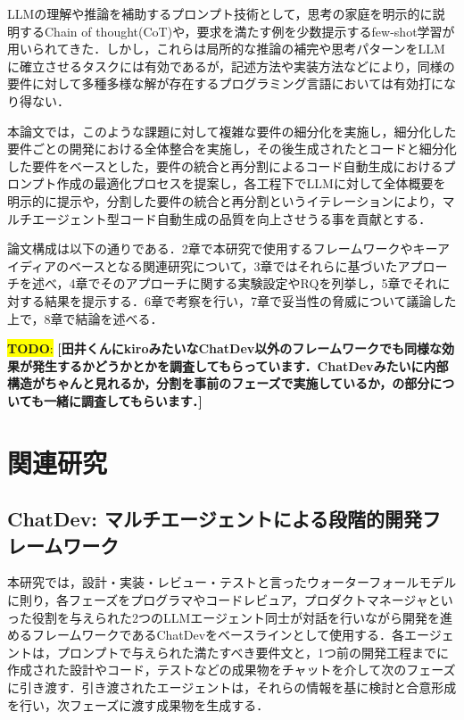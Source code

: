 \documentclass[submit,techrep,noauthor]{ipsj}
\newcommand{\todo}[1]{\colorbox{yellow}{{\bf TODO}:}{\color{red} {\textbf{[#1]}}}}
\begin{document}
LLMの理解や推論を補助するプロンプト技術として，思考の家庭を明示的に説明するChain of thought(CoT)や，要求を満たす例を少数提示するfew-shot学習が用いられてきた．しかし，これらは局所的な推論の補完や思考パターンをLLMに確立させるタスクには有効であるが，記述方法や実装方法などにより，同様の要件に対して多種多様な解が存在するプログラミング言語においては有効打になり得ない．

本論文では，このような課題に対して複雑な要件の細分化を実施し，細分化した要件ごとの開発における全体整合を実施し，その後生成されたとコードと細分化した要件をベースとした，要件の統合と再分割によるコード自動生成におけるプロンプト作成の最適化プロセスを提案し，各工程下でLLMに対して全体概要を明示的に提示や，分割した要件の統合と再分割というイテレーションにより，マルチエージェント型コード自動生成の品質を向上させうる事を貢献とする．

論文構成は以下の通りである．2章で本研究で使用するフレームワークやキーアイディアのベースとなる関連研究について，3章ではそれらに基づいたアプローチを述べ，4章でそのアプローチに関する実験設定やRQを列挙し，5章でそれに対する結果を提示する．6章で考察を行い，7章で妥当性の脅威について議論した上で，8章で結論を述べる．

\todo{田井くんにkiroみたいなChatDev以外のフレームワークでも同様な効果が発生するかどうかとかを調査してもらっています．ChatDevみたいに内部構造がちゃんと見れるか，分割を事前のフェーズで実施しているか，の部分についても一緒に調査してもらいます．}


\section{関連研究}
\label{sec:format}

\subsection{ChatDev: マルチエージェントによる段階的開発フレームワーク}
本研究では，設計・実装・レビュー・テストと言ったウォーターフォールモデルに則り，各フェーズをプログラマやコードレビュア，プロダクトマネージャといった役割を与えられた2つのLLMエージェント同士が対話を行いながら開発を進めるフレームワークであるChatDev\cite{qian-etal-2024-chatdev}をベースラインとして使用する．各エージェントは，プロンプトで与えられた満たすべき要件文と，1つ前の開発工程までに作成された設計やコード，テストなどの成果物をチャットを介して次のフェーズに引き渡す．引き渡されたエージェントは，それらの情報を基に検討と合意形成を行い，次フェーズに渡す成果物を生成する．
\end{document}
